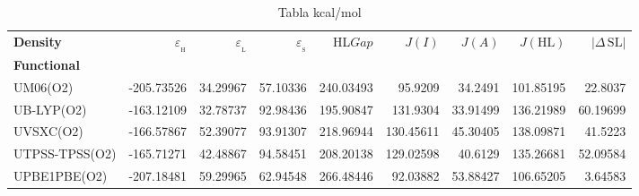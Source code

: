 \documentclass[preprint,landscape,12pt]{elsarticle}
\begin{document}
	\begin{table}
		\caption{ Tabla kcal/mol}
		\centering
		\footnotesize
		\begin{tabular}{lrrrrrrrr}
			\hline
			\textbf{Density}    & $\varepsilon_{_{\mathrm{H}}}$	& $\varepsilon_{_{\mathrm{L}}}$  & $\varepsilon_{_{\mathrm{S}}}$& HL$Gap$ & $J(I)$ & $J(A)$ & $J(\mathrm{HL})$  & \textbf{$\left|\Delta\,\mathrm{SL}\right|$}  \\
			\textbf{Functional} &   &  &     &   &  &  &  &  \\
			\hline \hline 

UM06(O2) & -205.73526 & 34.29967 & 57.10336 & 240.03493 & 95.9209 & 34.2491 & 101.85195 & 22.8037\\
UB-LYP(O2) & -163.12109 & 32.78737 & 92.98436 & 195.90847 & 131.9304 & 33.91499 & 136.21989 & 60.19699\\
UVSXC(O2) & -166.57867 & 52.39077 & 93.91307 & 218.96944 & 130.45611 & 45.30405 & 138.09871 & 41.5223\\
UTPSS-TPSS(O2) & -165.71271 & 42.48867 & 94.58451 & 208.20138 & 129.02598 & 40.6129 & 135.26681 & 52.09584\\
UPBE1PBE(O2) & -207.18481 & 59.29965 & 62.94548 & 266.48446 & 92.03882 & 53.88427 & 106.65205 & 3.64583\\

	 		\hline
		\end{tabular}
			\label{tab:kcal/mol}
	\end{table}
\end{document}
